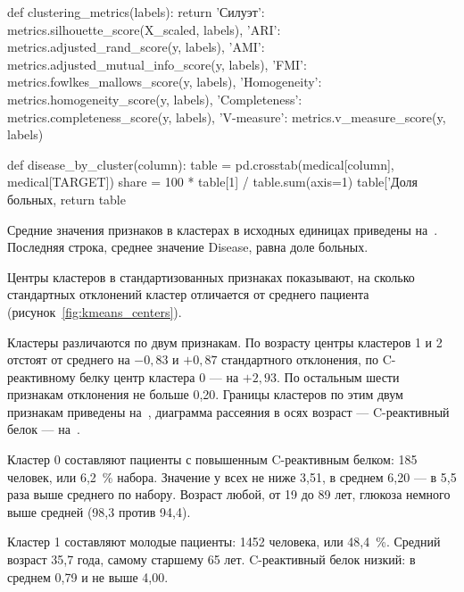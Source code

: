 \documentclass[a4paper,14pt]{extarticle}
\begin{document}
    def clustering_metrics(labels):
        return {'Силуэт': metrics.silhouette_score(X_scaled, labels),
                'ARI': metrics.adjusted_rand_score(y, labels),
                'AMI': metrics.adjusted_mutual_info_score(y, labels),
                'FMI': metrics.fowlkes_mallows_score(y, labels),
                'Homogeneity': metrics.homogeneity_score(y, labels),
                'Completeness': metrics.completeness_score(y, labels),
                'V-measure': metrics.v_measure_score(y, labels)}


    def disease_by_cluster(column):
        table = pd.crosstab(medical[column], medical[TARGET])
        share = 100 * table[1] / table.sum(axis=1)
        table['Доля больных, %
        return table

Средние значения признаков в кластерах в исходных единицах приведены на~. Последняя строка, среднее значение Disease, равна доле больных.


Центры кластеров в стандартизованных признаках показывают, на сколько стандартных отклонений кластер отличается от среднего пациента (рисунок~\ref{fig:kmeans_centers}).


Кластеры различаются по двум признакам. По возрасту центры кластеров 1 и 2 отстоят от среднего на $-0{,}83$ и $+0{,}87$ стандартного отклонения, по C-реактивному белку центр кластера 0 — на $+2{,}93$. По остальным шести признакам отклонения не больше 0,20. Границы кластеров по этим двум признакам приведены на~, диаграмма рассеяния в осях возраст — C-реактивный белок — на~.



Кластер 0 составляют пациенты с повышенным C-реактивным белком: 185 человек, или 6,2~\% набора. Значение у всех не ниже 3,51, в среднем 6,20 — в 5,5 раза выше среднего по набору. Возраст любой, от 19 до 89 лет, глюкоза немного выше средней (98,3 против 94,4).

Кластер 1 составляют молодые пациенты: 1452 человека, или 48,4~\%. Средний возраст 35,7 года, самому старшему 65 лет. C-реактивный белок низкий: в среднем 0,79 и не выше 4,00.
\end{document}
